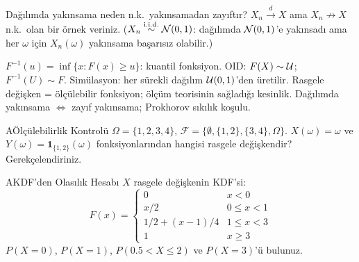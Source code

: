 \begin{kritiksorgu}
Dağılımda yakınsama neden n.k.\ yakınsamadan zayıftır? $X_n\overset{d}{\to}X$ ama $X_n\not\to X$ n.k.\ olan bir örnek veriniz. ($X_n\overset{\text{i.i.d.}}{\sim}\mathcal{N}(0,1)$: dağılımda $\mathcal{N}(0,1)$'e yakınsadı ama her $\omega$ için $X_n(\omega)$ yakınsama başarısız olabilir.)
\end{kritiksorgu}

\begin{mikroozet}
$F^{-1}(u) = \inf\{x: F(x)\geq u\}$: kuantil fonksiyon.
OID: $F(X)\sim\mathcal{U}$; $F^{-1}(U)\sim F$.
Simülasyon: her sürekli dağılım $\mathcal{U}(0,1)$'den üretilir.
Rasgele değişken = ölçülebilir fonksiyon; ölçüm teorisinin sağladığı kesinlik.
Dağılımda yakınsama $\iff$ zayıf yakınsama; Prokhorov sıkılık koşulu.
\end{mikroozet}


\cozumlualistirmalar

\begin{alistirma}[Al.3.1]{A}{Ölçülebilirlik Kontrolü}
$\Omega = \{1, 2, 3, 4\}$, $\mathcal{F} = \{\emptyset, \{1,2\}, \{3,4\}, \Omega\}$.
$X(\omega) = \omega$ ve $Y(\omega) = \mathbf{1}_{\{1,2\}}(\omega)$ fonksiyonlarından
hangisi rasgele değişkendir? Gerekçelendiriniz.
\end{alistirma}

\begin{alistirma}[Al.3.2]{A}{KDF'den Olasılık Hesabı}
$X$ rasgele değişkenin KDF'si:
\[
  F(x) = \begin{cases} 0 & x < 0 \\ x/2 & 0 \leq x < 1 \\ 1/2 + (x-1)/4 & 1 \leq x < 3 \\ 1 & x \geq 3 \end{cases}
\]
$P(X = 0)$, $P(X = 1)$, $P(0.5 < X \leq 2)$ ve $P(X = 3)$'ü bulunuz.
\end{alistirma}

